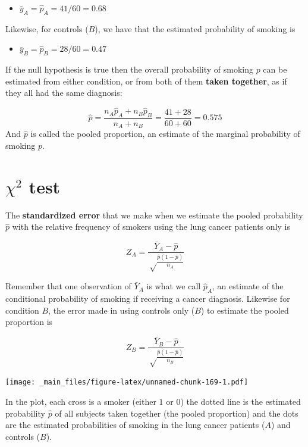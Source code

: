 \documentclass[
]{book}
\providecommand{\tightlist}{%
  \setlength{\itemsep}{0pt}\setlength{\parskip}{0pt}}
\begin{document}
\begin{itemize}
\tightlist
\item
  \(\bar{y}_A=\hat{p}_A=41/60=0.68\)
\end{itemize}

Likewise, for controls (\(B\)), we have that the estimated probability of smoking is

\begin{itemize}
\tightlist
\item
  \(\bar{y}_B=\hat{p}_B=28/60=0.47\)
\end{itemize}

If the null hypothesis is true then the overall probability of smoking \(p\) can be estimated from either condition, or from both of them \textbf{taken together}, as if they all had the same diagnosis:

\[\hat{p}=\frac{n_A\hat{p}_A+n_B\hat{p}_B}{n_A+n_B}=\frac{41+28}{60+60}=0.575\]
And \(\hat{p}\) is called the pooled proportion, an estimate of the marginal probability of smoking \(p\).

\hypertarget{chi2-test}{%
\section{\texorpdfstring{\(\chi^2\) test}{\textbackslash chi\^{}2 test}}\label{chi2-test}}

The \textbf{standardized error} that we make when we estimate the pooled probability \(\hat{p}\) with the relative frequency of smokers using the lung cancer patients only is

\[Z_A= \frac{\bar{Y}_A-\hat{p}}{\sqrt\frac{\hat{p}(1-\hat{p})}{n_A}}\]

Remember that one observation of \(\bar{Y}_A\) is what we call \(\hat{p}_A\), an estimate of the conditional probability of smoking if receiving a cancer diagnosis. Likewise for condition \(B\), the error made in using controls only (\(B\)) to estimate the pooled proportion is

\[Z_B= \frac{\bar{Y}_B-\hat{p}}{\sqrt\frac{\hat{p}(1-\hat{p})}{n_B}}\]

\texttt{[image: \_main\_files/figure-latex/unnamed-chunk-169-1.pdf]}

In the plot, each cross is a smoker (either \(1\) or \(0\)) the dotted line is the estimated probability \(\hat{p}\) of all subjects taken together (the pooled proportion) and the dots are the estimated probabilities of smoking in the lung cancer patients (\(A\)) and controls (\(B\)).
\end{document}
